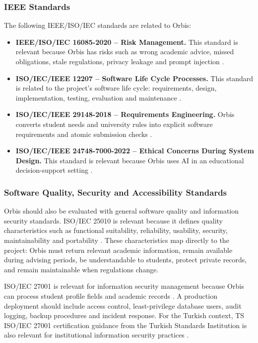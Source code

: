 \documentclass[a4paper,12pt]{article}
\begin{document}
\subsubsection{IEEE Standards}
The following IEEE/ISO/IEC standards are related to Orbis:

\begin{itemize}
    \item \textbf{IEEE/ISO/IEC 16085-2020 -- Risk Management.} This standard is relevant because Orbis has risks such as wrong academic advice, missed obligations, stale regulations, privacy leakage and prompt injection \cite{ieee16085}.
    \item \textbf{ISO/IEC/IEEE 12207 -- Software Life Cycle Processes.} This standard is related to the project's software life cycle: requirements, design, implementation, testing, evaluation and maintenance \cite{ieee12207}.
    \item \textbf{ISO/IEC/IEEE 29148-2018 -- Requirements Engineering.} Orbis converts student needs and university rules into explicit software requirements and atomic submission checks \cite{ieee29148}.
    \item \textbf{ISO/IEC/IEEE 24748-7000-2022 -- Ethical Concerns During System Design.} This standard is relevant because Orbis uses AI in an educational decision-support setting \cite{ieee24748_7000}.
\end{itemize}

\subsubsection{Software Quality, Security and Accessibility Standards}
Orbis should also be evaluated with general software quality and information security standards. ISO/IEC 25010 is relevant because it defines quality characteristics such as functional suitability, reliability, usability, security, maintainability and portability \cite{iso25010}. These characteristics map directly to the project: Orbis must return relevant academic information, remain available during advising periods, be understandable to students, protect private records, and remain maintainable when regulations change.

ISO/IEC 27001 is relevant for information security management because Orbis can process student profile fields and academic records \cite{iso27001}. A production deployment should include access control, least-privilege database users, audit logging, backup procedures and incident response. For the Turkish context, TS ISO/IEC 27001 certification guidance from the Turkish Standards Institution is also relevant for institutional information security practices \cite{tse27001}.
\end{document}

